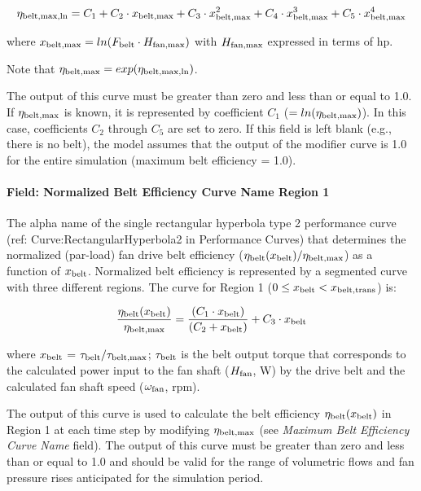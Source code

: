 \begin{equation}
\eta_{\rm{belt, max, ln}} = C_1 + C_2 \cdot x_{\rm{belt, max}} + C_3 \cdot x_{\rm{belt, max}}^2 + C_4 \cdot x_{\rm{belt, max}}^3 + C_5 \cdot x_{\rm{belt, max}}^4
\end{equation}

where \(x_{\rm{belt, max}} = ln(F_{\rm{belt}} \cdot H_{\rm{fan, max}})\) with \(H_{\rm{fan, max}}\) expressed in terms of hp.

Note that \(\eta_{\rm{belt, max}} = exp(\eta_{\rm{belt, max, ln}})\).

The output of this curve must be greater than zero and less than or equal to 1.0. If \(\eta_{\rm{belt, max}}\) is known, it is represented by coefficient \(C_1\) (\(= ln(\eta_{\rm{belt, max}})\)). In this case, coefficients \(C_2\) through \(C_5\) are set to zero. If this field is left blank (e.g., there is no belt), the model assumes that the output of the modifier curve is 1.0 for the entire simulation (maximum belt efficiency = 1.0).

\paragraph{Field: Normalized Belt Efficiency Curve Name Region 1}\label{field-normalized-belt-efficiency-curve-name-region-1}

The alpha name of the single rectangular hyperbola type 2 performance curve (ref: Curve:RectangularHyperbola2 in Performance Curves) that determines the normalized (par-load) fan drive belt efficiency (\(\eta_{\rm{belt}}(x_{\rm{belt}}) / \eta_{\rm{belt, max}}\)) as a function of \(x_{\rm{belt}}\). Normalized belt efficiency is represented by a segmented curve with three different regions. The curve for Region 1 (\(0 \le x_{\rm{belt}} < x_{\rm{belt, trans}}\)) is:

\begin{equation}
  \frac{\eta_{\rm{belt}} ( x_{\rm{belt}} )}{\eta_{\rm{belt, max}}} = \frac{(C_1 \cdot x_{\rm{belt}})}{(C_2 + x_{\rm{belt}})} + C_3 \cdot x_{\rm{belt}}
\end{equation}

where \(x_{\rm{belt}}\) = \(\tau_{\rm{belt}} / \tau_{\rm{belt, max}}\); \(\tau_{\rm{belt}}\) is the belt output torque that corresponds to the calculated power input to the fan shaft (\(H_{\rm{fan}}\), W) by the drive belt and the calculated fan shaft speed (\(\omega_{\rm{fan}}\), rpm).

The output of this curve is used to calculate the belt efficiency \(\eta_{\rm{belt}} (x_{\rm{belt}})\) in Region 1 at each time step by modifying \(\eta_{\rm{belt, max}}\) (see \emph{Maximum Belt Efficiency Curve Name} field). The output of this curve must be greater than zero and less than or equal to 1.0 and should be valid for the range of volumetric flows and fan pressure rises anticipated for the simulation period.

